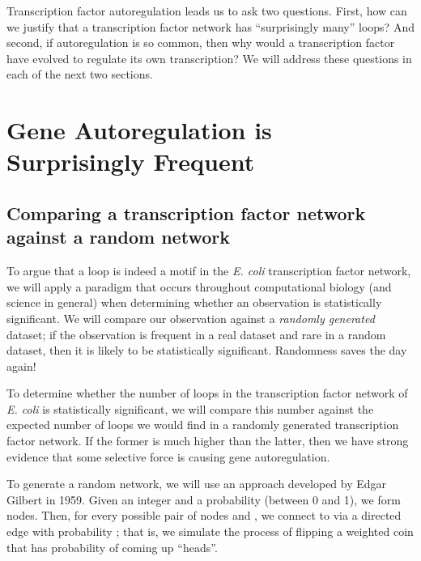 Transcription factor autoregulation leads us to ask two questions. First, how can we justify that a transcription factor network has ``surprisingly many'' loops? And second, if autoregulation is so common, then why would a transcription factor have evolved to regulate its own transcription? We will address these questions in each of the next two sections.\\

\FloatBarrier
{}

\section{Gene Autoregulation is Surprisingly Frequent}
\label{sec:gene_autoregulation_is_surprisingly_frequent}

\subsection{Comparing a transcription factor network against a random network}

To argue that a loop is indeed a motif in the \textit{E. coli} transcription factor network, we will apply a paradigm that occurs throughout computational biology (and science in general) when determining whether an observation is statistically significant. We will compare our observation against a  \textit{randomly generated} dataset; if the observation is frequent in a real dataset and rare in a random dataset, then it is likely to be statistically significant. Randomness saves the day again!\\

 \begin{qbox}\end{qbox}

To determine whether the number of loops in the transcription factor network of \textit{E. coli} is statistically significant, we will compare this number against the expected number of loops we would find in a randomly generated transcription factor network. If the former is much higher than the latter, then we have strong evidence that some selective force is causing gene autoregulation.

To generate a random network, we will use an approach developed by Edgar Gilbert in 1959. Given an integer  and a probability  (between 0 and 1), we form  nodes. Then, for every possible pair of nodes  and , we connect  to  via a directed edge with probability ; that is, we simulate the process of flipping a weighted coin that has probability  of coming up ``heads''.\\

